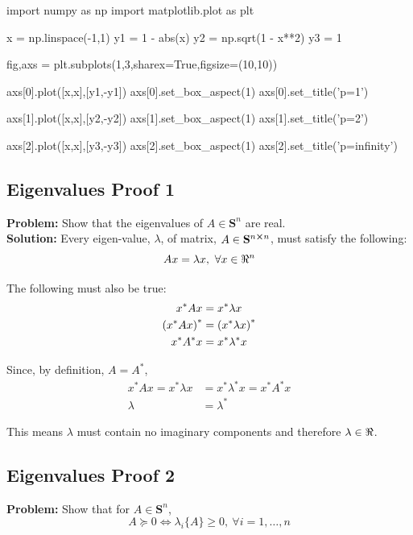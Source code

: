 \documentclass[letter]{article}
\begin{document}
\begin{python}
import numpy as np
import matplotlib.plot as plt

x = np.linspace(-1,1)
y1 = 1 - abs(x)
y2 = np.sqrt(1 - x**2)
y3 = 1

fig,axs = plt.subplots(1,3,sharex=True,figsize=(10,10))

axs[0].plot([x,x],[y1,-y1])
axs[0].set_box_aspect(1)
axs[0].set_title('p=1')

axs[1].plot([x,x],[y2,-y2])
axs[1].set_box_aspect(1)
axs[1].set_title('p=2')

axs[2].plot([x,x],[y3,-y3])
axs[2].set_box_aspect(1)
axs[2].set_title('p=infinity')

\end{python}


\newpage
\subsection{Eigenvalues Proof 1}
\textbf{Problem:}
Show that the eigenvalues of $A \in \mathbf{S}^n$ are real.\\

\noindent
\textbf{Solution:}
Every eigen-value, $\lambda$, of matrix, $A \in \mathbf{S}^{n \cross n}$, must satisfy the following:
\begin{displaymath}
	A x = \lambda x, \ \forall x \in \real^n
\end{displaymath}

The following must also be true:
\begin{align*}
	x^* A x &= x^* \lambda x\\
	\qty(x^* A x)^* &= \qty(x^* \lambda x)^*\\
	x^* A^* x &= x^* \lambda^* x\\
\end{align*}

Since, by definition, $A = A^*$,
\begin{align*}
	x^* A x = x^* \lambda x &= x^* \lambda^* x = x^* A^* x\\
	\lambda &= \lambda^*
\end{align*}

This means $\lambda$ must contain no imaginary components and therefore $\lambda \in \real$.


\newpage
\subsection{Eigenvalues Proof 2}
\textbf{Problem:}
Show that for $A \in \mathbf{S}^n$,
$$A \succeq 0 \iff \lambda_i\{A\} \geq 0 ,\ \forall i = 1, \dots, n$$\\
\end{document}
